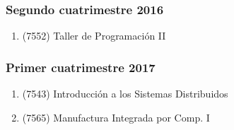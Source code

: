 \documentclass[a4paper,11pt]{article}
\begin{document}
\subsubsection{Segundo cuatrimestre 2016}

\begin{enumerate}
  \item (7552) Taller de Programación II
\end{enumerate}

\subsubsection{Primer cuatrimestre 2017}

\begin{enumerate}
  \item (7543) Introducción a los Sistemas Distribuidos
  \item (7565) Manufactura Integrada por Comp. I
\end{enumerate}
\end{document}
